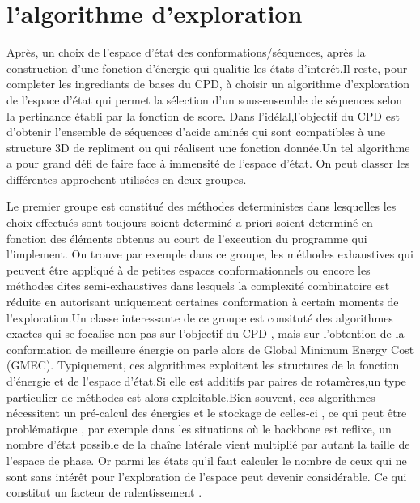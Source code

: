 \section{l'algorithme d'exploration}

Après, un choix de l'espace d'état des conformations/séquences, après la construction d'une fonction d'énergie qui qualitie les états d'interét.Il reste, pour completer les ingrediants de bases du CPD, à choisir un algorithme d'exploration de l'espace d'état qui permet la sélection d'un sous-ensemble de séquences selon la pertinance établi par la fonction de score. Dans l'idélal,l'objectif du CPD est d'obtenir l'ensemble de séquences d'acide aminés qui sont compatibles à une structure 3D de repliment ou qui réalisent une fonction donnée.Un tel algorithme a pour grand défi de faire face à immensité de l'espace d'état. On peut classer les différentes approchent utilisées en deux groupes.

\begin{enumerate}
  Le premier groupe est constitué des méthodes deterministes dans lesquelles les choix effectués sont toujours soient determiné  a priori soient determiné en fonction des éléments obtenus au court de l'execution du programme qui l'implement. On trouve par exemple dans ce groupe, les méthodes exhaustives qui peuvent être appliqué à de petites espaces conformationnels ou encore les méthodes dites semi-exhaustives dans lesquels la complexité combinatoire est réduite en autorisant uniquement  certaines conformation à certain moments de l'exploration.Un classe interessante de ce groupe est consituté des algorithmes exactes qui se focalise non pas sur l'objectif du  CPD , mais sur l'obtention  de la conformation  de meilleure  énergie on parle alors de \og Global Minimum Energy Cost \fg (GMEC).
Typiquement, ces algorithmes exploitent les structures de la fonction d'énergie et de l'espace d'état.Si elle est additifs par paires de rotamères,un type particulier de méthodes est alors exploitable.Bien souvent, ces algorithmes  nécessitent un pré-calcul des énergies et le stockage de celles-ci , ce qui peut être problématique , par exemple dans les situations où le backbone est reflixe, un nombre d'état possible de la chaîne latérale vient multiplié par autant la taille de l'espace de phase. Or parmi les états qu'il faut calculer le nombre de ceux qui ne sont sans intérêt pour l'exploration de l'espace peut devenir considérable. Ce qui constitut un facteur de ralentissement . 
  
\end{enumerate}

